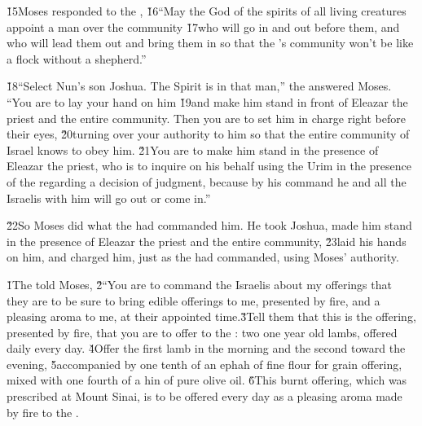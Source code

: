 \v{15}Moses responded to the , \v{16}``May the  God of the spirits of all living creatures appoint a man over the community \v{17}who will go in and out before them, and who will lead them out and bring them in so that the 's community won't be like a flock without a shepherd.''

\v{18}``Select Nun's son Joshua. The Spirit is in that man,'' the  answered Moses. ``You are to lay your hand on him \v{19}and make him stand in front of Eleazar the priest and the entire community. Then you are to set him in charge right before their eyes, \v{20}turning over your authority to him so that the entire community of Israel knows to obey him. \v{21}You are to make him stand in the presence of Eleazar the priest, who is to inquire on his behalf using the Urim in the presence of the  regarding a decision of judgment, because by his command he and all the Israelis with him will go out or come in.''

\v{22}So Moses did what the  had commanded him. He took Joshua, made him stand in the presence of Eleazar the priest and the entire community, \v{23}laid his hands on him, and charged him, just as the  had commanded, using Moses' authority.

\v{1}The  told Moses, \v{2}``You are to command the Israelis about my offerings that they are to be sure to bring edible offerings to me, presented by fire, and a pleasing aroma to me, at their appointed time.\v{3}Tell them that this is the offering, presented by fire, that you are to offer to the : two one year old lambs, offered daily every day. \v{4}Offer the first lamb in the morning and the second toward the evening, \v{5}accompanied by one tenth of an ephah of fine flour for grain offering, mixed with one fourth of a hin of pure olive oil. \v{6}This burnt offering, which was prescribed at Mount Sinai, is to be offered every day as a pleasing aroma made by fire to the .

